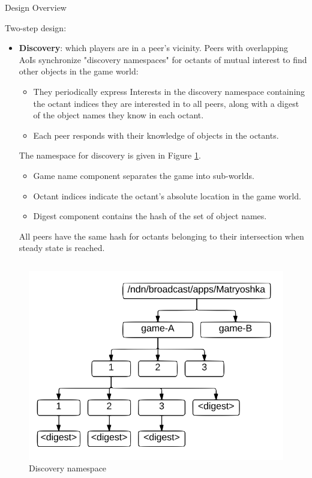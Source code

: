 \documentclass[final,hyperref={pdfpagelabels=false},20pt]{beamer}
\begin{document}
\begin{frame}[t]
\begin{columns}[t]
\begin{column}{.465\textwidth}
\begin{block}{Design Overview}

Two-step design:
\begin{itemize}
\item \textbf{Discovery}: which players are in a peer's vicinity. \newline
Peers with overlapping AoIs synchronize "discovery namespaces" for octants of mutual interest to find other objects in the game world:
\begin{itemize}
\item They periodically express Interests in the discovery namespace containing the octant indices they are interested in to all peers, along with a digest of the object names they know in each octant.   
\item Each peer responds with their knowledge of objects in the octants.
\end{itemize}
The namespace for discovery is given in Figure \ref{fig:discoverynamespace}. 
\begin{itemize}
\item Game name component separates the game into sub-worlds.
\item Octant indices indicate the octant’s absolute location in the game world. 
\item Digest component contains the hash of the set of object names.
\end{itemize}
All peers have the same hash for octants belonging to their intersection when steady state is reached.
\end{itemize}

\begin{columns}
\begin{column}{.42\textwidth}

\begin{figure}
\includegraphics[width=\linewidth]{DiscoveryNamespace}
\caption{Discovery namespace}
\label{fig:discoverynamespace}
\end{figure}
\end{column}


\end{columns}
\end{block}
\end{column}
\end{columns}
\end{frame}
\end{document}
